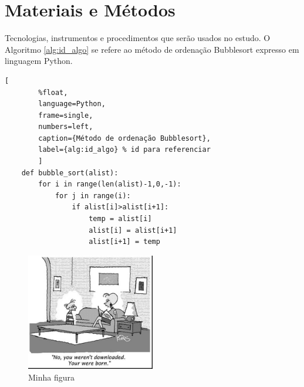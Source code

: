 \documentclass[12pt]{article}
\begin{document}

\section{Materiais e Métodos}
    Tecnologias, instrumentos e procedimentos que serão usados no estudo. O Algoritmo \ref{alg:id_algo} se refere ao método de ordenação Bubblesort expresso em linguagem Python.

    \begin{lstlisting}[  
        %float,
        language=Python, 
        frame=single, 
        numbers=left,
        caption={Método de ordenação Bubblesort},
        label={alg:id_algo} % id para referenciar
        ]        
    def bubble_sort(alist):
        for i in range(len(alist)-1,0,-1):
            for j in range(i):
                if alist[i]>alist[i+1]:
                    temp = alist[i]
                    alist[i] = alist[i+1]
                    alist[i+1] = temp    
    \end{lstlisting}

    \begin{figure}[H]
        \centering
        \includegraphics[width=0.5\textwidth]{fig1.jpg}
        \caption{Minha figura}
        \label{fig:id_figura}
    \end{figure}
    
\end{document}
